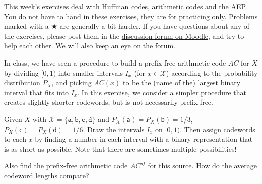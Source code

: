 \documentclass[a4paper,10pt,landscape,twocolumn]{scrartcl}
\begin{document}
\practiceproblems

{\sffamily\noindent
This week's exercises deal with Huffman codes, arithmetic codes and the AEP. You do not have to hand in these exercises, they are for practicing only. Problems marked with a $\bigstar$ are generally a bit harder. If you have questions about any of the exercises, please post them in the \href{https://www.moodle.ch/lms/mod/forum/view.php?id=1761}{discussion forum on Moodle}, and try to help each other. We will also keep an eye on the forum.
}

\begin{exercise}
In class, we have seen a procedure to build a prefix-free arithmetic code $AC$ for $X$ by dividing $[0,1)$ into smaller intervals $I_x$ (for $x \in \mathcal{X}$) according to the probability distribution $P_X$, and picking $AC(x)$ to be the (name of the) largest binary interval that fits into $I_x$. In this exercise, we consider a simpler procedure that creates slightly shorter codewords, but is not necessarily prefix-free.
	\begin{subex}
	Given $X$ with $\mathcal{X} = \{\mathtt{a,b,c,d}\}$ and $P_X(\mathsf{a}) = P_X(\mathsf{b}) = 1/3$, $P_X(\mathsf{c}) = P_X(\mathsf{d}) = 1/6$. Draw the intervals $I_x$ on $[0,1)$. Then assign codewords to each $x$ by finding a number in each interval with a binary representation that is as short as possible. Note that there are sometimes multiple possibilities!
	\end{subex}
	\begin{subex}
	Also find the prefix-free arithmetic code $AC^{pf}$ for this source. How do the average codeword lengths compare?
	\end{subex}
\end{exercise}
\end{document}
